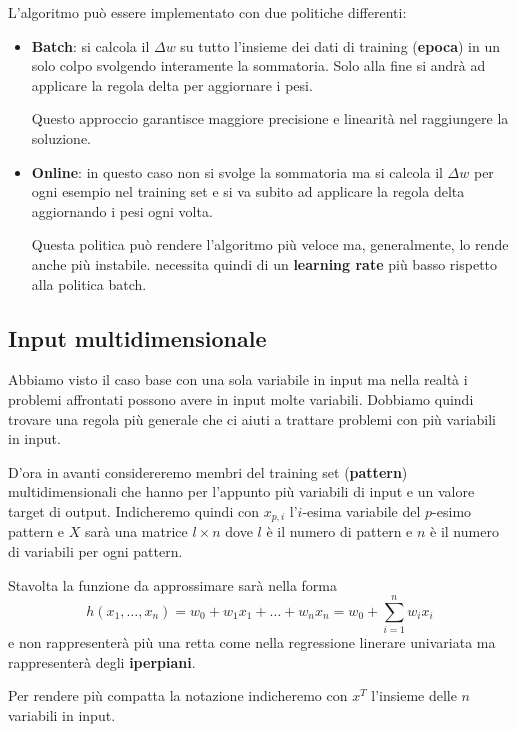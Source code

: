 L'algoritmo pu\`o essere implementato con due politiche differenti:
\begin{itemize}
	\item \textbf{Batch}: si calcola il $\Delta w$ su tutto l'insieme dei dati di training (\textbf{epoca}) in un solo
	      colpo svolgendo interamente la sommatoria. Solo alla fine si andr\`a ad applicare la regola delta per aggiornare
	      i pesi.

	      Questo approccio garantisce maggiore precisione e linearit\`a nel raggiungere la soluzione.
	\item \textbf{Online}: in questo caso non si svolge la sommatoria ma si calcola il $\Delta w$ per ogni esempio nel
	      training set e si va subito ad applicare la regola delta aggiornando i pesi ogni volta.

	      Questa politica pu\`o rendere l'algoritmo pi\`u veloce ma, generalmente, lo rende anche pi\`u instabile. necessita
	      quindi di un \textbf{learning rate} pi\`u basso rispetto alla politica batch.
\end{itemize}

\subsection{Input multidimensionale}
Abbiamo visto il caso base con una sola variabile in input ma nella realt\`a i problemi affrontati possono avere in input
molte variabili. Dobbiamo quindi trovare una regola pi\`u generale che ci aiuti a trattare problemi con pi\`u variabili in
input.

D'ora in avanti considereremo membri del training set (\textbf{pattern}) multidimensionali che hanno per l'appunto pi\`u
variabili di input e un valore target di output. Indicheremo quindi con $x_{p, i}$ l'$i$-esima variabile del $p$-esimo
pattern e $X$ sar\`a una matrice $l \times n$ dove $l$ \`e il numero di pattern e $n$ \`e il numero di variabili per ogni
pattern.

Stavolta la funzione da approssimare sar\`a nella forma
\[ h(x_1, \dots, x_n) = w_0 + w_1 x_1 + \dots + w_n x_n = w_0 + \sum_{i=1}^n w_i x_i \]
e non rappresenter\`a pi\`u una retta come nella regressione linerare univariata ma rappresenter\`a degli
\textbf{iperpiani}.

Per rendere pi\`u compatta la notazione indicheremo con $x^T$ l'insieme delle $n$ variabili in input.